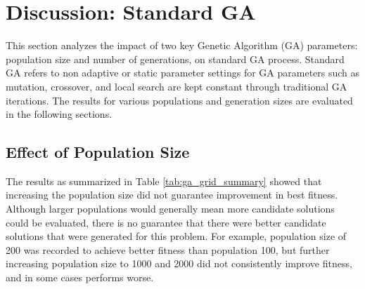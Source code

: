 \documentclass{article}
\begin{document}



\newpage
\section{Discussion: Standard GA}

This section analyzes the impact of two key Genetic Algorithm (GA) parameters: population size and number of generations, on standard GA process. Standard GA refers to non adaptive or static parameter settings for GA parameters such as mutation, crossover, and local search are kept constant through traditional GA iterations. The results for various populations and generation sizes are evaluated in the following sections.

\subsection{Effect of Population Size}
The results as summarized in Table \ref{tab:ga_grid_summary} showed that increasing the population size did not guarantee improvement in best fitness. Although larger populations would generally mean more candidate solutions could be evaluated, there is no guarantee that there were better candidate solutions that were generated for this problem. For example, population size of 200 was recorded to achieve better fitness than population 100, but further increasing population size to 1000 and 2000 did not consistently improve fitness, and in some cases performs worse.
\end{document}
